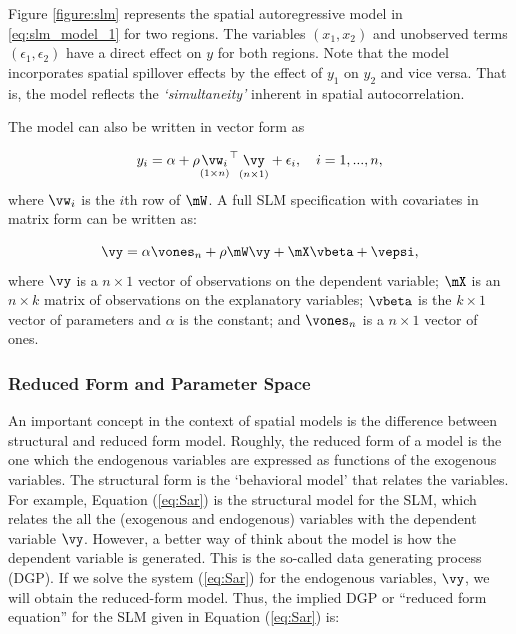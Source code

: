 \documentclass[english,12pt]{book}\usepackage[]{graphicx}\usepackage[]{xcolor}
\begin{document}
Figure \ref{figure:slm}	represents the spatial autoregressive model in \eqref{eq:slm_model_1} for two regions. The variables $(x_1, x_2)$ and unobserved terms $(\epsilon_1, \epsilon_2)$ have a direct effect on $y$ for both regions. Note that the model incorporates spatial spillover effects by the effect of $y_1$ on $y_2$ and vice versa. That is, the model reflects the \emph{`simultaneity'} inherent in spatial autocorrelation.  

The model can also be  written in vector form as

\begin{equation*}
y_i = \alpha + \rho \underset{(1\times n)}{\vw_i}^\top \underset{(n\times 1)}{\vy} + \epsilon_i, \quad i = 1,...,n,   
\end{equation*}
%
where $\vw_i$ is the $i$th row of $\mW$. A full SLM specification with covariates in matrix form can be written as:

\begin{equation}\label{eq:Sar}
\vy  =  \alpha \vones_n+ \rho \mW\vy + \mX\vbeta + \vepsi,
\end{equation}
%
where $\vy$ is a $n\times 1$ vector of observations on the dependent variable; $\mX$ is an $n\times k$ matrix of observations on the explanatory variables; $\vbeta$ is the $k\times 1$ vector of parameters and $\alpha$ is the constant; and $\vones_n$ is a $n\times 1$ vector of ones.

\subsubsection{Reduced Form and Parameter Space}

An important concept in the context of spatial models is the difference between structural and reduced form model. Roughly, the reduced form of a model is the one which the endogenous variables are expressed as functions of the exogenous variables. The structural form is the `behavioral model' that relates the variables. For example, Equation (\ref{eq:Sar}) is the structural model for the SLM, which relates the all the (exogenous and endogenous) variables with the dependent variable $\vy$. However, a better way of think about the model is how the dependent variable is generated. This is the so-called data generating process (DGP). If we solve the system (\ref{eq:Sar}) for the endogenous variables, $\vy$, we will obtain the reduced-form model. Thus, the implied 
DGP or ``reduced form equation'' for the SLM given in Equation (\ref{eq:Sar}) is:
\end{document}
